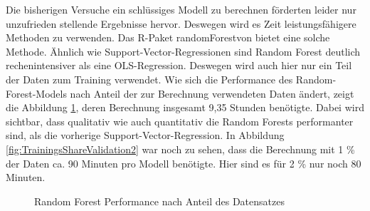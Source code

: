 \documentclass[a4paper,12pt]{thesis}
\begin{document}
Die bisherigen Versuche ein schlüssiges Modell zu berechnen förderten leider nur unzufrieden stellende Ergebnisse hervor. Deswegen wird es Zeit leistungsfähigere Methoden zu verwenden. Das R-Paket \glqq randomForest\grqq  von \cite{Liaw2002} bietet eine solche Methode. Ähnlich wie Support-Vector-Regressionen sind Random Forest deutlich rechenintensiver als eine OLS-Regression. Deswegen wird auch hier nur ein Teil der Daten zum Training verwendet. Wie sich die Performance des Random-Forest-Models nach Anteil der zur Berechnung verwendeten Daten ändert, zeigt die Abbildung \ref{fig:TrainingsShareValidation1}, deren Berechnung insgesamt 9,35 Stunden benötigte. Dabei wird sichtbar, dass qualitativ wie auch quantitativ die Random Forests performanter sind, als die vorherige Support-Vector-Regression. In Abbildung \ref{fig:TrainingsShareValidation2} war noch zu sehen, dass die Berechnung mit 1 \% der Daten ca. 90 Minuten pro Modell benötigte. Hier sind es für 2 \% nur noch 80 Minuten.

\begin{figure}%
	\centering
	\qquad
	\caption{Random Forest Performance nach Anteil des Datensatzes}%
	\label{fig:TrainingsShareValidation1}%
\end{figure}
\end{document}
